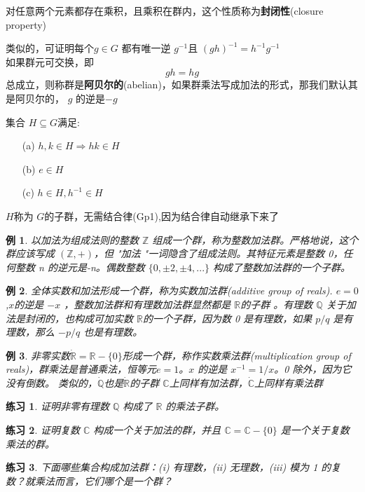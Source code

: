 \documentclass[hyperref,UTF8]{ctexbook}
\newtheorem{eg}{例}[chapter]
\newtheorem*{exercise}{练习}
\begin{document}
对任意两个元素都存在乘积，且乘积在群内，这个性质称为\textbf{封闭性}(closure property)

类似的，可证明每个$g\in G$ 都有唯一逆 $g^{-1}$且 $(gh)^{-1}=h^{-1}g^{-1}$ 
\\
如果群元可交换，即\[gh=hg\]总成立，则称群是\textbf{阿贝尔的}(abelian)，如果群乘法写成加法的形式，那我们默认其是阿贝尔的， $g$ 的逆是$-g$ 

集合 $H\subseteq G$满足:
\begin{enumerate}
    \item[(a)] $h,k\in H\Rightarrow hk\in H$ 
    \item[(b)] $e\in H$ 
    \item[(c)] $h\in H,h^{-1}\in H$ 
\end{enumerate} 
$H$称为 $G$的子群，无需结合律(Gp1),因为结合律自动继承下来了 
\begin{eg}
    以加法为组成法则的整数 $\mathbb{Z}$ 组成一个群，称为整数加法群。严格地说，这个群应该写成 $(\mathbb{Z},+)$，但 "加法 "一词隐含了组成法则。其特征元素是整数 0，任何整数 n 的逆元是-n。偶数整数 $\{0, \pm 2, \pm 4,...\} $ 构成了整数加法群的一个子群。
\end{eg} 
\begin{eg}
    全体实数和加法形成一个群，称为实数加法群(additive group of reals). $e=0$,$x$的逆是 $-x$ ，整数加法群和有理数加法群显然都是 $\mathbb{R}$的子群 。有理数 $\mathbb{Q}$ 关于加法是封闭的，也构成可加实数 $\mathbb{R}$的一个子群，因为数 0 是有理数，如果 $p /q$ 是有理数，那么 $-p /q$ 也是有理数。
\end{eg}
\begin{eg}
    非零实数$\dot{\mathbb{R}}=\mathbb{R}-\{0\}$形成一个群，称作实数乘法群(multiplication group of reals)，群乘法是普通乘法，恒等元$e=1$。$x$ 的逆是 $x^{-1}=1 /x$。0 除外，因为它没有倒数。
    类似的，$\mathbb{\dot{Q}}$也是$\mathbb{\dot{R}}$的子群
    $\mathbb{C}$上同样有加法群，$\mathbb{\dot{C}}$上同样有乘法群
\end{eg}
\begin{exercise}
    证明非零有理数 $\mathbb{Q}$ 构成了 $\mathbb{R}$ 的乘法子群。
\end{exercise}
\begin{exercise}
    证明复数 $\mathbb{C}$ 构成一个关于加法的群，并且 $\mathbb{C}=\mathbb{C}-\{0\}$ 是一个关于复数乘法的群。
\end{exercise}
\begin{exercise}
    下面哪些集合构成加法群：(i) 有理数，(ii) 无理数，(iii) 模为 1 的复数？就乘法而言，它们哪个是一个群？
\end{exercise}
\end{document}
